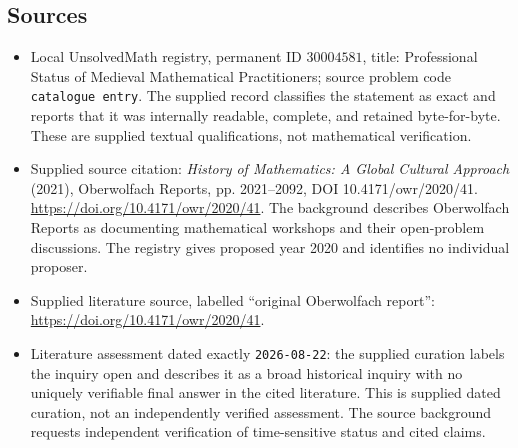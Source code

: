 \documentclass[11pt]{article}
\begin{document}
\subsection{Sources}
\begin{itemize}
\item Local UnsolvedMath registry, permanent ID \(30004581\), title: Professional Status of Medieval Mathematical Practitioners; source problem code \texttt{catalogue entry}. The supplied record classifies the statement as exact and reports that it was internally readable, complete, and retained byte-for-byte. These are supplied textual qualifications, not mathematical verification.
\item Supplied source citation: \emph{History of Mathematics: A Global Cultural Approach} (2021), Oberwolfach Reports, pp. 2021--2092, DOI 10.4171/owr/2020/41. \url{https://doi.org/10.4171/owr/2020/41}. The background describes Oberwolfach Reports as documenting mathematical workshops and their open-problem discussions. The registry gives proposed year 2020 and identifies no individual proposer.
\item Supplied literature source, labelled ``original Oberwolfach report'': \url{https://doi.org/10.4171/owr/2020/41}.
\item Literature assessment dated exactly \texttt{2026-08-22}: the supplied curation labels the inquiry open and describes it as a broad historical inquiry with no uniquely verifiable final answer in the cited literature. This is supplied dated curation, not an independently verified assessment. The source background requests independent verification of time-sensitive status and cited claims.
\end{itemize}
\end{document}
